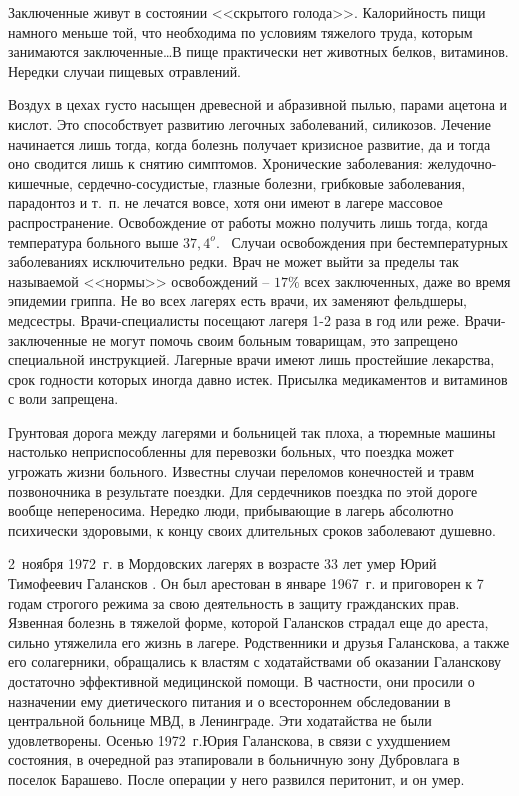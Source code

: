 \documentclass{book}
\begin{document}
Заключенные живут в состоянии <<скрытого голода>>. Калорийность пищи намного меньше той, что необходима по усло­виям тяжелого труда, которым занимаются заключенные\ldots В пище практически нет животных белков, витаминов. Нередки случаи пищевых отравлений.

Воздух в цехах густо насыщен древесной и абразивной пылью, парами ацетона и кислот. Это способствует развитию легочных заболеваний, силикозов. Лечение начинается лишь тогда, когда болезнь получает кризисное развитие, да и тогда оно сводится лишь к снятию симптомов. Хронические заболевания: желудочно-кишечные, сердечно-сосудистые, глазные болезни, грибковые заболевания, парадонтоз и т.~п. не лечатся вовсе, хотя они имеют в лагере массовое распространение. Освобождение от работы можно получить лишь тогда, когда температура больного выше $37,4^{o}$.  Случаи освобождения при бестемпературных заболеваниях исключительно редки. Врач не может выйти за пределы так называемой <<нормы>> освобождений -- $17\%$ всех заключенных, даже во время эпидемии гриппа. Не во всех лагерях есть врачи, их заменяют фельдшеры, медсестры. Врачи-специалисты посещают лагеря 1-2 раза в год или реже. Врачи-заключенные не могут помочь своим больным товарищам, это запрещено специальной инструкцией. Лагерные врачи имеют лишь простейшие 
лекарства, срок годности кото­рых иногда давно истек. Присылка медикаментов и витаминов с воли запрещена.

Грунтовая дорога между лагерями и больницей так плоха, а тюремные машины настолько неприспособленны для перевозки больных, что поездка может угрожать жизни больного. Известны случаи переломов конечностей и травм позвоночника в результате поездки. Для сердечников поездка по этой дороге вообще непереносима. Нередко люди, прибывающие в лагерь абсолютно психически здоровыми, к концу своих длительных сроков заболевают душевно.

2~ноября 1972~г. в Мордовских лагерях в возрасте 33 лет умер Юрий Тимофеевич Галансков%
.
Он был арестован в январе 1967~г. и приговорен к 7 годам строгого режима за свою деятельность в защиту гражданских прав. Язвенная болезнь в тяжелой форме, которой Галансков страдал еще до ареста, сильно утяжелила его жизнь в лагере. Родственники и друзья Галанскова, а также его солагерники, обращались к властям с ходатайствами об оказании Галанскову достаточно эффективной медицинской помощи. В частности, они просили о назначении ему диетического питания и о всестороннем обследова­нии в центральной больнице МВД, в Ленинграде. Эти ходатайства не были удовлетворены. Осенью 1972~г.Юрия Галанскова, в связи с ухудшением состояния, в очередной раз этапировали в больничную зону Дубровлага в поселок Барашево. После операции у него развился перитонит, и он умер.
\end{document}

